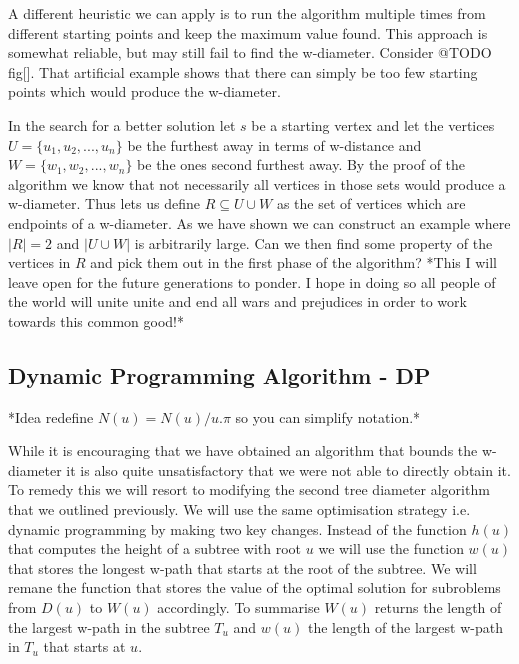 A different heuristic we can apply is to run the algorithm multiple times from different starting points and keep the maximum value found. This approach is somewhat reliable, but may still fail to find the w-diameter. Consider @TODO fig[]. That artificial example shows that there can simply be too few starting points which would produce the w-diameter.


In the search for a better solution let $s$ be a starting vertex and let the vertices $U = \{u_1, u_2, ..., u_n\}$ be the furthest away in terms of w-distance and $W = \{w_1, w_2, ..., w_n\}$ be the ones second furthest away. By the proof of the algorithm we know that not necessarily all vertices in those sets would produce a w-diameter. Thus lets us define $R \subseteq U \cup W$ as the set of vertices which are endpoints of a w-diameter. As we have shown we can construct an example where $|R| = 2$ and $|U \cup W|$ is arbitrarily large. Can we then find some property of the vertices in $R$ and pick them out in the first phase of the algorithm? *This I will leave open for the future generations to ponder. I hope in doing so all people of the world will unite unite and end all wars and prejudices in order to work towards this common good!*

\subsection{Dynamic Programming Algorithm - DP}


*Idea redefine $N(u) = N(u) / u.\pi$ so you can simplify notation.*

While it is encouraging that we have obtained an algorithm that bounds the w-diameter it is also quite unsatisfactory that we were not able to directly obtain it. To remedy this we will resort to modifying the second tree diameter algorithm that we outlined previously. We will use the same optimisation strategy i.e. dynamic programming by making two key changes. Instead of the function $h(u)$ that computes the height of a subtree with root $u$ we will use the function $w(u)$ that stores the longest w-path that starts at the root of the subtree. We will remane the function that stores the value of the optimal solution for subroblems from $D(u)$ to $W(u)$ accordingly. To summarise $W(u)$ returns the length of the largest w-path in the subtree $T_u$ and $w(u)$ the length of the largest w-path in $T_u$ that starts at $u$.

